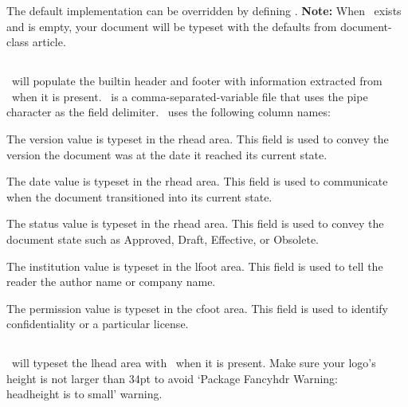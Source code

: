 \documentclass[12pt]{tlc-article}
\makeatletter
\def\tlcProduct{tlc-article}
\def\tlcA{\tlcDarkblue{\tlcProduct}}
\def\tlcHF{\textit{\tlc@headerFooter}}
\def\tlcLG{\textit{\tlc@logoFile}}
\def\tlcVE{\textit{\tlc@versionFile}}
\makeatother
\begin{document}
The default implementation can be overridden by defining \tlcHF. \textbf{Note:}
When \tlcHF\ exists and is empty, your document will be typeset with the
defaults from document-class article.


\clearpage
\subsection{\tlcVE}
\tlcA\ will populate the builtin header and footer with information extracted
from \tlcVE\ when it is present.  \tlcVE\ is a comma-separated-variable file
that uses the pipe character as the field delimiter.  \tlcVE\ uses the following
column names:

\begin{description}[style=nextline]
  \item[version] The version value is typeset in the rhead area.  This field is
    used to convey the version the document was at the date it reached its
    current state.

  \item[date] The date value is typeset in the rhead area.  This field is used
    to communicate when the document transitioned into its current state.

  \item[status] The status value is typeset in the rhead area.  This field is
    used to convey the document state such as Approved, Draft, Effective, or
    Obsolete.

  \item[instatution] The institution value is typeset in the lfoot area.  This
    field is used to tell the reader the author name or company name.

  \item[permission]  The permission value is typeset in the cfoot area.  This
    field is used to identify confidentiality or a particular license. 

\end{description}


\subsection{\tlcLG}
\tlcA\ will typeset the lhead area with \tlcLG\ when it is present. Make sure
your logo's height is not larger than 34pt to avoid `Package Fancyhdr Warning:
\\headheight is to small' warning.
\end{document}
